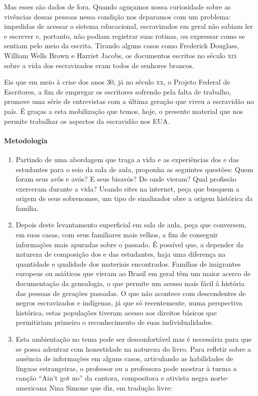 \documentclass[11pt]{extarticle}
\begin{document}
Mas esses são dados de fora. Quando aguçamos nossa curiosidade sobre as vivências dessas pessoas
nessa  condição nos deparamos com um problema: impedidas de acessar o sistema educacional,
escravizados em geral não sabiam ler e escrever e, portanto, não podiam registrar suas rotinas,
ou expressar como se sentiam pelo meio da escrita. Tirando alguns casos como Frederick Douglass,
William Wells Brown e Harriet Jacobs, os documentos escritos no século \textsc{xix} sobre a vida dos escravizados
eram todos de senhores brancos. 

Eis que em meio à crise dos anos 30, já no século \textsc{xx}, o Projeto Federal de Escritores, a fim de 
empregar os escritores sofrendo pela falta de trabalho, promove uma série de entrevistas com a
última geração que viveu a escravidão no país. É graças a esta mobilização que temos, hoje, 
o presente material que nos permite trabalhar os aspectos da escravidão nos EUA. 

\paragraph{Metodologia}

\begin{enumerate}

  \item
  Partindo de uma abordagem que traga a vida e as experiências dos e das estudantes para
  o seio da sala de aula, proponha as seguintes questões: Quem foram seus avôs e avós?
  E seus bisavós? De onde vieram? Qual profissão exerceram durante a vida? 
  Usando sites na internet, peça que busquem a origem de seus sobrenomes, um tipo
  de sinalizador obre a origem histórica da família. 

  \item
  Depois deste levantamento superficial em sala de aula, peça que conversem, em suas
  casas, com seus familiares mais velhos, a fim de conseguir informações mais apuradas
  sobre o passado. É possível que, a depender da natureza de composição dos e das estudantes, 
  haja uma diferença na quantidade e qualidade dos
  materiais encontrados. Famílias de imigrantes europeus ou asiáticos que vieram
  ao Brasil em geral têm um maior acerco de documentação da genealogia, o que
  permite um acesso mais fácil à história das pessoas de gerações passadas. 
  O que não acontece com descendentes de negros escravizados e indígenas, já
  que só recentemente, numa perspectiva histórica, estas populações tiveram acesso 
  aos direitos básicos que permitiriam primeiro o reconhecimento de suas
  individualidades. 

  \item
  Esta ambientação no tema pode ser desconfortável mas é necessária para 
  que se possa adentrar com honestidade na natureza do livro. Para refletir
  sobre a ausência de informações em alguns casos, articulando as habilidades de 
  línguas estrangeiras, o professor ou a professora pode mostrar à turma a canção 
  ``Ain't got no'' da cantora, compositora e ativista negra norte-americana 
  Nina Simone que diz, em tradução livre:

\end{enumerate}
\end{document}

